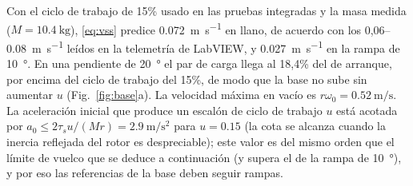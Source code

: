 Con el ciclo de trabajo de 15\% usado en las pruebas integradas y la masa medida ($M=\SI{10.4}{\kilo\gram}$), \eqref{eq:vss} predice \SI{0.072}{\metre\per\second} en llano, de acuerdo con los 0,06--\SI{0.08}{\metre\per\second} leídos en la telemetría de LabVIEW, y \SI{0.027}{\metre\per\second} en la rampa de \SI{10}{\degree}. En una pendiente de \SI{20}{\degree} el par de carga llega al 18,4\% del de arranque, por encima del ciclo de trabajo del 15\%, de modo que la base no sube sin aumentar $u$ (Fig.~\ref{fig:base}a). La velocidad máxima en vacío es $r\omega_0=\SI{0.52}{\metre\per\second}$. La aceleración inicial que produce un escalón de ciclo de trabajo $u$ está acotada por $a_0\le 2\tau_su/(Mr)=\SI{2.9}{\metre\per\second\squared}$ para $u=0.15$ (la cota se alcanza cuando la inercia reflejada del rotor es despreciable); este valor es del mismo orden que el límite de vuelco que se deduce a continuación (y supera el de la rampa de \SI{10}{\degree}), y por eso las referencias de la base deben seguir rampas.

